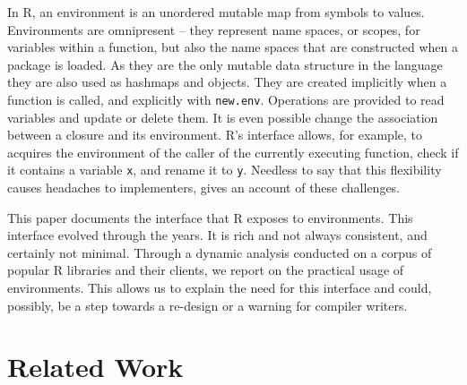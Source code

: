 \documentclass[10pt,review,sigplan,authorversion=true]{acmart}
\renewcommand{\c}[1]{\lstinline |#1|\xspace}
\begin{document}
In R, an environment is an unordered mutable map from symbols to values.
Environments are omnipresent -- they represent name spaces, or scopes, for
variables within a function, but also the name spaces that are constructed when
a package is loaded. As they are the only mutable data structure in the language
they are also used as hashmaps and objects. They are created implicitly when a
function is called, and explicitly with \c{new.env}. Operations are provided to
read variables and update or delete them. It is even possible change the
association between a closure and its environment. R's interface allows, for
example, to acquires the environment of the caller of the currently executing
function, check if it contains a variable \c{x}, and rename it to \c{y}.
Needless to say that this flexibility causes headaches to implementers,
\citet{dls19} gives an account of these challenges.

This paper documents the interface that R exposes to environments. This
interface evolved through the years. It is rich and not always consistent, and
certainly not minimal. Through a dynamic analysis conducted on a corpus of
popular R libraries and their clients, we report on the practical usage of
environments. This allows us to explain the need for this interface and could,
possibly, be a step towards a re-design or a warning for compiler writers.

\newpage

\section{Related Work}
\end{document}
